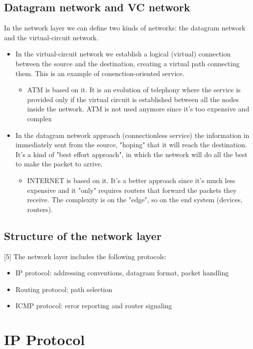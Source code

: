 \subsection{Datagram network and VC network}
In the network layer we can define two kinds of networks: the datagram network and the virtual-circuit network.
\begin{itemize}
    \item In the virtual-circuit network we establish a logical (virtual) connection between the source and the destination, creating a virtual path connecting them. This is an example of conenction-oriented service.
    \begin{itemize}
        \item ATM is based on it. It is an evolution of telephony where the service is provided only if the virtual circuit is established between all the nodes inside the network. ATM is not used anymore since it's too expensive and complex
    \end{itemize}
    \item In the datagram network approach (connectionless service) the information in immediately sent from the source, "hoping" that it will reach the destination. It's a kind of "best effort approach", in which the network will do all the best to make the packet to arrive.
    \begin{itemize}
        \item INTERNET is based on it. It's a better approach since it's much less expensive and it "only" requires routers that forward the packets they receive. The complexity is on the "edge", so on the end system (devices, routers).
    \end{itemize}
\end{itemize}

\subsection{Structure of the network layer}[5] 
The network layer includes the following protocols:
\begin{itemize}
    \item IP protocol: addressing conventions, datagram format, packet handling
    \item Routing protocol: path selection
    \item ICMP protocol: error reporting and router signaling
\end{itemize}

\section{IP Protocol}
